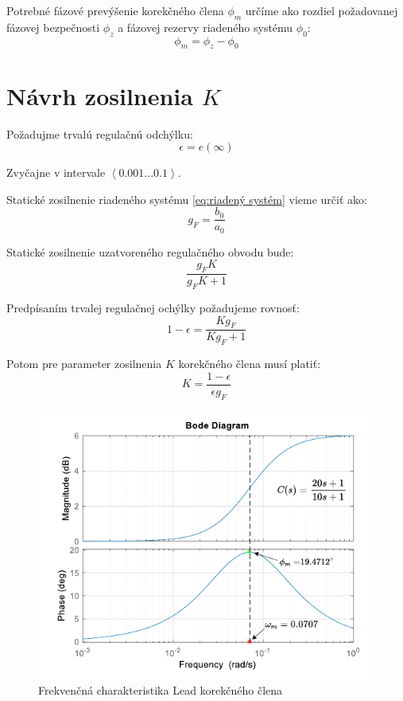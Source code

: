 \documentclass[a4paper,10pt]{article}
\begin{document}
Potrebné fázové prevýšenie korekčného člena $\phi_m$ určíme ako rozdiel požadovanej fázovej bezpečnosti $\phi_z$ a fázovej rezervy riadeného systému $\phi_0$:
\begin{equation}
\phi_m=\phi_z-\phi_0
\end{equation}



\section{Návrh zosilnenia $K$} 
Požadujme trvalú regulačnú odchýlku:
\begin{equation}
\epsilon=e(\infty)
\end{equation}

Zvyčajne v intervale $\left<0.001 \ldots 0.1 \right>$.

Statické zosilnenie riadeného systému \eqref{eq:riadený systém} vieme určiť ako:
\begin{equation}
g_F=\frac{b_0}{a_0}
\end{equation}

Statické zosilnenie uzatvoreného regulačného obvodu bude:
\begin{equation}
 \frac{g_F K}{g_F K+1}
\end{equation}

Predpísaním trvalej regulačnej ochýlky požadujeme rovnosť:
\begin{equation}
1-\epsilon=\frac{K g_F}{K g_F+1}
\end{equation} 

Potom pre parameter zosilnenia $K$ korekčného člena musí platiť:
\begin{equation}
K=\frac{1-\epsilon}{\epsilon g_F}
\end{equation}



\begin{figure}[ht]
\centering
\includegraphics[scale=0.75]{LeadBode}
\caption{Frekvenčná charakteristika Lead korekčného člena}
\end{figure}
\end{document}
